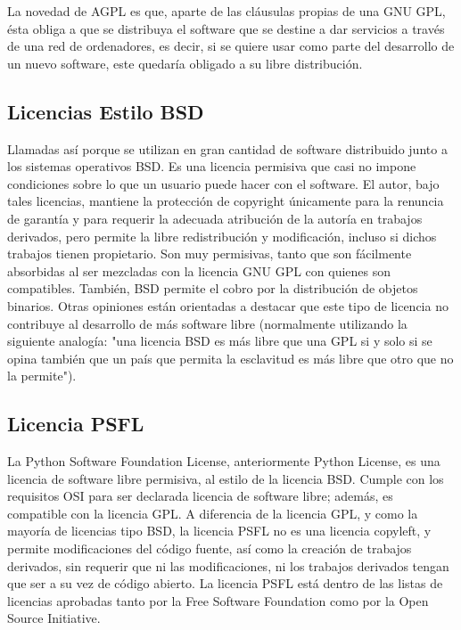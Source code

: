 				La novedad de AGPL es que, aparte de las cláusulas propias de una GNU GPL, ésta obliga a que se distribuya el software que se destine a dar servicios a través de una red de ordenadores, es decir, si se quiere usar como parte del desarrollo de un nuevo software, este quedaría obligado a su libre distribución.\par
				
			\subsection{Licencias Estilo BSD}\label{bsd}
			
				Llamadas así porque se utilizan en gran cantidad de software distribuido junto a los sistemas operativos BSD. Es una licencia permisiva que casi no impone condiciones sobre lo que un usuario puede hacer con el software. El autor, bajo tales licencias, mantiene la protección de copyright únicamente para la renuncia de garantía y para requerir la adecuada atribución de la autoría en trabajos derivados, pero permite la libre redistribución y modificación, incluso si dichos trabajos tienen propietario. Son muy permisivas, tanto que son fácilmente absorbidas al ser mezcladas con la licencia GNU GPL con quienes son compatibles. También, BSD permite el cobro por la distribución de objetos binarios. Otras opiniones están orientadas a destacar que este tipo de licencia no contribuye al desarrollo de más software libre (normalmente utilizando la siguiente analogía: "una licencia BSD es más libre que una GPL si y solo si se opina también que un país que permita la esclavitud es más libre que otro que no la permite").\par
			
			\subsection{Licencia PSFL}\label{psfl}
			
				La Python Software Foundation License, anteriormente Python License, es una licencia de software libre permisiva, al estilo de la licencia BSD. Cumple con los requisitos OSI para ser declarada licencia de software libre; además, es compatible con la licencia GPL. A diferencia de la licencia GPL, y como la mayoría de licencias tipo BSD, la licencia PSFL no es una licencia copyleft, y permite modificaciones del código fuente, así como la creación de trabajos derivados, sin requerir que ni las modificaciones, ni los trabajos derivados tengan que ser a su vez de código abierto. La licencia PSFL está dentro de las listas de licencias aprobadas tanto por la Free Software Foundation como por la Open Source Initiative.\par
				
